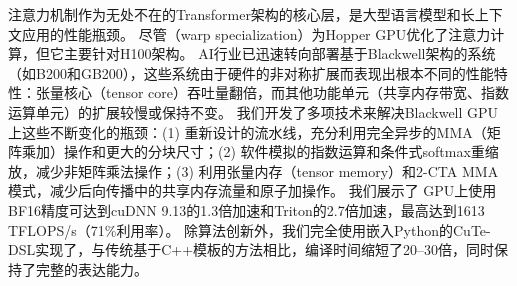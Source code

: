 注意力机制作为无处不在的Transformer架构的核心层，是大型语言模型和长上下文应用的性能瓶颈。
尽管（warp specialization）为Hopper GPU优化了注意力计算，但它主要针对H100架构。
AI行业已迅速转向部署基于Blackwell架构的系统（如B200和GB200），这些系统由于硬件的非对称扩展而表现出根本不同的性能特性：张量核心（tensor core）吞吐量翻倍，而其他功能单元（共享内存带宽、指数运算单元）的扩展较慢或保持不变。
我们开发了多项技术来解决Blackwell GPU上这些不断变化的瓶颈：(1) 重新设计的流水线，充分利用完全异步的MMA（矩阵乘加）操作和更大的分块尺寸；(2) 软件模拟的指数运算和条件式softmax重缩放，减少非矩阵乘法操作；(3) 利用张量内存（tensor memory）和2-CTA MMA模式，减少后向传播中的共享内存流量和原子加操作。
我们展示了 GPU上使用BF16精度可达到cuDNN 9.13的1.3倍加速和Triton的2.7倍加速，最高达到1613 TFLOPS/s（71\%利用率）。
除算法创新外，我们完全使用嵌入Python的CuTe-DSL实现了\faf，与传统基于C++模板的方法相比，编译时间缩短了20--30倍，同时保持了完整的表达能力。
